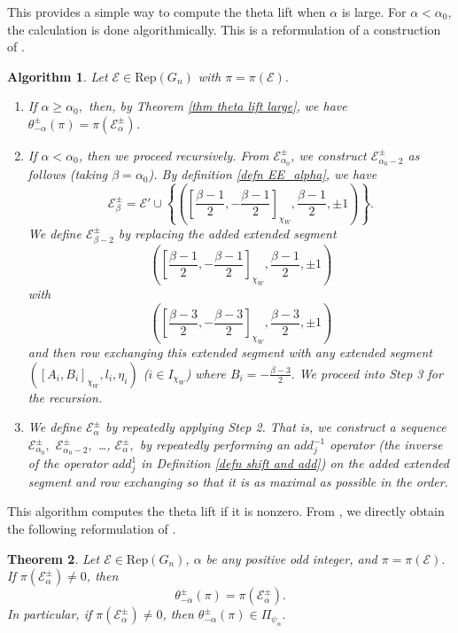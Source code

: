 \documentclass[11pt,letterpaper]{amsart}
\newcommand{\Rep}{{\mathrm{Rep}}}
\newcommand{\EE}{\mathcal{E}}
\newtheorem{thm}{Theorem}[section]
\newtheorem{algo}[thm]{Algorithm}
\numberwithin{equation}{section}
\begin{document}
This provides a simple way to compute the theta lift when $\alpha$ is large. For $\alpha< \alpha_0$, the calculation is done algorithmically. This is a reformulation of a construction of \cite{BH22}.
\begin{algo}\label{algo compute theta lift}
    Let $\EE\in\Rep(G_n)$ with $\pi=\pi(\EE).$ 
    \begin{enumerate}
        \item If $\alpha\geq\alpha_0,$ then, by Theorem \ref{thm theta lift large}, we have $\theta_{-\alpha}^{\pm}(\pi)=\pi(\EE_\alpha^\pm)$. 
        \item  If $\alpha<\alpha_0$, then we proceed recursively. From $\EE^\pm_{\alpha_0}$, we construct $\EE^\pm_{\alpha_0-2}$ as follows (taking $\beta=\alpha_0$). By definition \ref{defn EE_alpha}, we have  
        \[
    \EE_\beta^\pm=\EE'\cup\left\{\left(\left[\frac{\beta-1}{2},-\frac{\beta-1}{2}\right]_{\chi_W}, \frac{\beta-1}{2},\pm1 \right)\right\}.
    \]
    We define $\EE^\pm_{\beta-2}$ by replacing the added extended segment 
    \[\left(\left[\frac{\beta-1}{2},-\frac{\beta-1}{2}\right]_{\chi_W}, \frac{\beta-1}{2},\pm1 \right)\] 
    with 
    \[\left(\left[\frac{\beta-3}{2},-\frac{\beta-3}{2}\right]_{\chi_W}, \frac{\beta-3}{2},\pm1 \right)\]
    and then row exchanging this extended segment with any extended segment $([A_i,B_i]_{\chi_W},l_i,\eta_i)$ ($i\in I_{\chi_W}$) where $B_i=-\frac{\beta-3}{2}.$ We proceed into Step 3 for the recursion.
    \item We define $\EE^\pm_{\alpha}$ by repeatedly applying Step 2. That is, we construct a sequence  $\EE_{\alpha_0}^\pm,$ $\EE_{\alpha_0-2}^\pm,$ \dots, $\EE_{\alpha}^\pm,$ by repeatedly performing an $add_j^{-1}$ operator (the inverse of the operator $add_j^1$ in Definition \ref{defn shift and add}) on the added extended segment and row exchanging so that it is as maximal as possible in the order.
    \end{enumerate}
\end{algo}

This algorithm computes the theta lift if it is nonzero. From \cite[Theorem 7.5]{HLL25}, we directly obtain the following reformulation of \cite[Theorem A]{BH22}.

\begin{thm}\label{thm compute theta lift}
    Let $\EE\in\Rep(G_n)$, $\alpha$ be any positive odd integer, and $\pi=\pi(\EE).$ If $\pi(\EE_\alpha^\pm)\neq0$, then
    \[
    \theta_{-\alpha}^{\pm}(\pi)=\pi(\EE_\alpha^\pm).
    \]
    In particular, if $\pi(\EE_\alpha^\pm)\neq0$, then $\theta_{-\alpha}^{\pm}(\pi)\in\Pi_{\psi_\alpha}.$
\end{thm}
\end{document}
